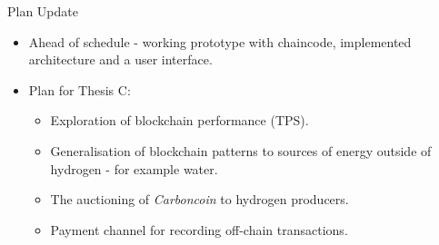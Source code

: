 \begin{frame}{Plan Update}
    \begin{itemize}
        \item Ahead of schedule - working prototype with chaincode, implemented
              architecture and a user interface.
        \item Plan for Thesis C:
              \begin{itemize}
                  \item Exploration of blockchain performance (TPS).
                  \item Generalisation of blockchain patterns to sources of
                        energy outside of hydrogen - for example water.
                  \item The auctioning of \textit{Carboncoin} to hydrogen
                        producers.
                  \item Payment channel for recording off-chain transactions.
              \end{itemize}
    \end{itemize}
\end{frame}